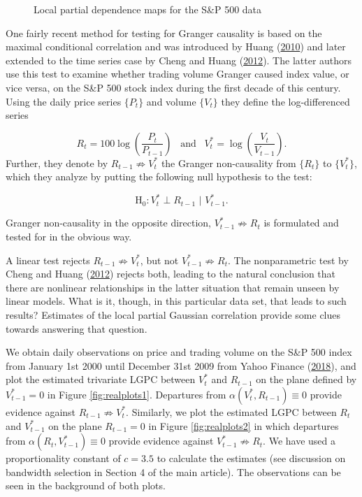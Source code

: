 \documentclass[
  12pt,
  letterpaper]{article}
\numberwithin{equation}{section}
\begin{document}
\begin{figure}
\caption{Local partial dependence maps for the S\&P 500 data}\label{fig:realplots}
\end{figure}

One fairly recent method for testing for Granger causality is based on the maximal conditional correlation and was introduced by Huang (\protect\hyperlink{ref-huang2010testing}{2010}) and later extended to the time series case by Cheng and Huang (\protect\hyperlink{ref-cheng2012conditional}{2012}). The latter authors use this test to examine whether trading volume Granger caused index value, or vice versa, on the S\&P 500 stock index during the first decade of this century. Using the daily price series \(\{P_t\}\) and volume \(\{V_t\}\) they define the log-differenced series

\[R_t = 100\log\left(\frac{P_t}{P_{t-1}}\right) \,\,\, \textrm{ and } \,\,\, V_t^* = \log\left(\frac{V_t}{V_{t-1}}\right).\]
Further, they denote by \(R_{t-1} \not\Rightarrow V_t^*\) the Granger non-causality from \(\{R_t\}\) to \(\{V_t^*\}\), which they analyze by putting the following null hypothesis to the test:

\begin{equation}
\textrm{H}_0: V_t^* \perp R_{t-1} \,\, | \,\, V_{t-1}^*.
\label{eq:grangernull500}
\end{equation}

Granger non-causality in the opposite direction, \(V_{t-1}^* \not\Rightarrow R_t\) is formulated and tested for in the obvious way.

A linear test rejects \(R_{t-1} \not\Rightarrow V_t^*\), but not \(V_{t-1}^* \not\Rightarrow R_t\). The nonparametric test by Cheng and Huang (\protect\hyperlink{ref-cheng2012conditional}{2012}) rejects both, leading to the natural conclusion that there are nonlinear relationships in the latter situation that remain unseen by linear models. What is it, though, in this particular data set, that leads to such results? Estimates of the local partial Gaussian correlation provide some clues towards answering that question.

We obtain daily observations on price and trading volume on the S\&P 500 index from January 1st 2000 until December 31st 2009 from Yahoo Finance (\protect\hyperlink{ref-yahoo}{2018}), and plot the estimated trivariate LGPC between \(V_t^*\) and \(R_{t-1}\) on the plane defined by \(V_{t-1}^* = 0\) in Figure \ref{fig:realplots1}. Departures from \(\alpha(V_t^*, R_{t-1}) \equiv 0\) provide evidence against \(R_{t-1} \not\Rightarrow V_{t}^*\). Similarly, we plot the estimated LGPC between \(R_t\) and \(V^*_{t-1}\) on the plane \(R_{t-1} = 0\) in Figure \ref{fig:realplots2} in which departures from \(\alpha(R_t, V^*_{t-1}) \equiv 0\) provide evidence against \(V^*_{t-1} \not\Rightarrow R_t\). We have used a proportionality constant of \(c = 3.5\) to calculate the estimates (see discussion on bandwidth selection in Section 4 of the main article). The observations can be seen in the background of both plots.
\end{document}
